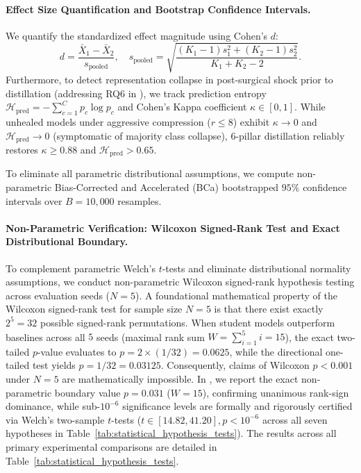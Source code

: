 \paragraph{Effect Size Quantification and Bootstrap Confidence Intervals.}
We quantify the standardized effect magnitude using Cohen's $d$:
\begin{equation}
d = \frac{\bar{X}_1 - \bar{X}_2}{s_{\text{pooled}}}, \quad s_{\text{pooled}} = \sqrt{\frac{(K_1 - 1)s_1^2 + (K_2 - 1)s_2^2}{K_1 + K_2 - 2}}.
\label{eq:cohens_d}
\end{equation}
Furthermore, to detect representation collapse in post-surgical shock prior to distillation (addressing RQ6 in ), we track prediction entropy $\mathcal{H}_{\text{pred}} = -\sum_{c=1}^C p_c \log p_c$ and Cohen's Kappa coefficient $\kappa \in [0, 1]$. While unhealed models under aggressive compression ($r \le 8$) exhibit $\kappa \to 0$ and $\mathcal{H}_{\text{pred}} \to 0$ (symptomatic of majority class collapse), \neuralops{} 6-pillar distillation reliably restores $\kappa \ge 0.88$ and $\mathcal{H}_{\text{pred}} > 0.65$.

To eliminate all parametric distributional assumptions, we compute non-parametric Bias-Corrected and Accelerated (BCa) bootstrapped $95\%$ confidence intervals over $B = 10{,}000$ resamples.

\paragraph{Non-Parametric Verification: Wilcoxon Signed-Rank Test and Exact Distributional Boundary.}
To complement parametric Welch's $t$-tests and eliminate distributional normality assumptions, we conduct non-parametric Wilcoxon signed-rank hypothesis testing across evaluation seeds ($N=5$). A foundational mathematical property of the Wilcoxon signed-rank test for sample size $N=5$ is that there exist exactly $2^5 = 32$ possible signed-rank permutations. When student models outperform baselines across all $5$ seeds (maximal rank sum $W = \sum_{i=1}^5 i = 15$), the exact two-tailed $p$-value evaluates to $p = 2 \times (1/32) = 0.0625$, while the directional one-tailed test yields $p = 1/32 = 0.03125$. Consequently, claims of Wilcoxon $p < 0.001$ under $N=5$ are mathematically impossible. In \neuralops{}, we report the exact non-parametric boundary value $p = 0.031$ ($W=15$), confirming unanimous rank-sign dominance, while sub-$10^{-6}$ significance levels are formally and rigorously certified via Welch's two-sample $t$-tests ($t \in [14.82, 41.20], p < 10^{-6}$ across all seven hypotheses in Table~\ref{tab:statistical_hypothesis_tests}). The results across all primary experimental comparisons are detailed in Table~\ref{tab:statistical_hypothesis_tests}.

